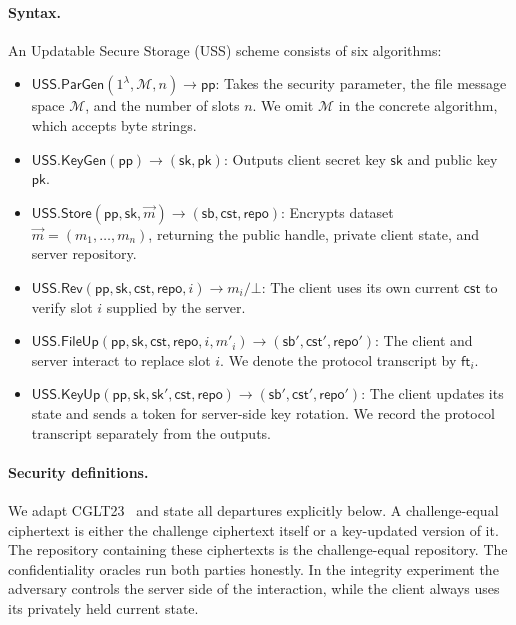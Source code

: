 \paragraph{Syntax.}
An Updatable Secure Storage (USS) scheme consists of six algorithms:
\begin{itemize}
    \item $\mathsf{USS.ParGen}(1^\lambda,\mathcal M,n) \to \mathsf{pp}$: Takes the security parameter, the file message space $\mathcal M$, and the number of slots $n$. We omit $\mathcal M$ in the concrete algorithm, which accepts byte strings.
    \item $\mathsf{USS.KeyGen}(\mathsf{pp}) \to (\mathsf{sk}, \mathsf{pk})$: Outputs client secret key $\mathsf{sk}$ and public key $\mathsf{pk}$.
    \item $\mathsf{USS.Store}(\mathsf{pp}, \mathsf{sk}, \vec{m}) \to (\mathsf{sb},\mathsf{cst},\mathsf{repo})$: Encrypts dataset $\vec{m} = (m_1, \dots, m_n)$, returning the public handle, private client state, and server repository.
    \item $\mathsf{USS.Rev}(\mathsf{pp},\mathsf{sk},\mathsf{cst},\mathsf{repo},i) \to m_i / \bot$: The client uses its own current $\mathsf{cst}$ to verify slot $i$ supplied by the server.
    \item $\mathsf{USS.FileUp}(\mathsf{pp},\mathsf{sk},\mathsf{cst},\mathsf{repo},i,m'_i) \to (\mathsf{sb}',\mathsf{cst}',\mathsf{repo}')$: The client and server interact to replace slot $i$. We denote the protocol transcript by $\mathsf{ft}_i$.
    \item $\mathsf{USS.KeyUp}(\mathsf{pp},\mathsf{sk},\mathsf{sk}',\mathsf{cst},\mathsf{repo}) \to (\mathsf{sb}',\mathsf{cst}',\mathsf{repo}')$: The client updates its state and sends a token for server-side key rotation. We record the protocol transcript separately from the outputs.
\end{itemize}

\paragraph{Security definitions.}
We adapt CGLT23~\cite[Sec.~3.2, Figs.~1--4]{CGLT23} and state all departures explicitly below. A challenge-equal ciphertext is either the challenge ciphertext itself or a key-updated version of it. The repository containing these ciphertexts is the challenge-equal repository. The confidentiality oracles run both parties honestly. In the integrity experiment the adversary controls the server side of the interaction, while the client always uses its privately held current state.

